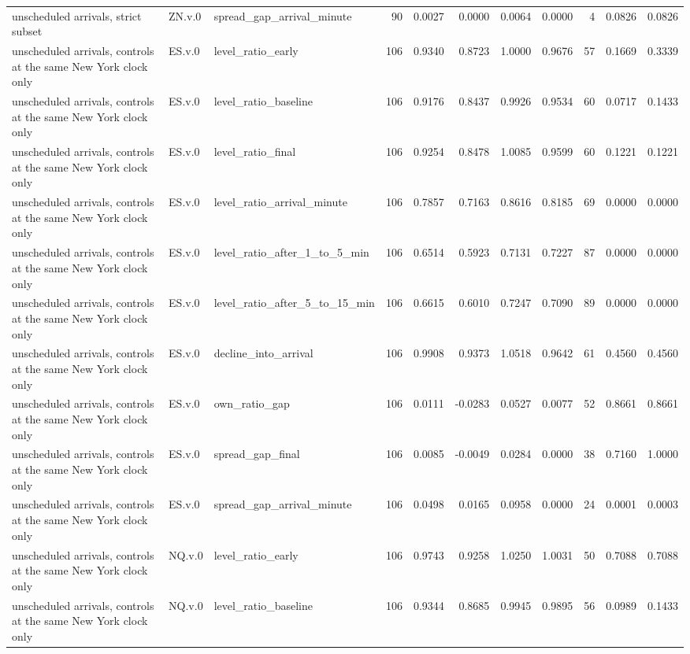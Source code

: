 \begin{tabular}{lllrrrrrrrr}
unscheduled arrivals, strict subset & ZN.v.0 & spread_gap_arrival_minute & 90 & 0.0027 & 0.0000 & 0.0064 & 0.0000 & 4 & 0.0826 & 0.0826 \\
unscheduled arrivals, controls at the same New York clock only & ES.v.0 & level_ratio_early & 106 & 0.9340 & 0.8723 & 1.0000 & 0.9676 & 57 & 0.1669 & 0.3339 \\
unscheduled arrivals, controls at the same New York clock only & ES.v.0 & level_ratio_baseline & 106 & 0.9176 & 0.8437 & 0.9926 & 0.9534 & 60 & 0.0717 & 0.1433 \\
unscheduled arrivals, controls at the same New York clock only & ES.v.0 & level_ratio_final & 106 & 0.9254 & 0.8478 & 1.0085 & 0.9599 & 60 & 0.1221 & 0.1221 \\
unscheduled arrivals, controls at the same New York clock only & ES.v.0 & level_ratio_arrival_minute & 106 & 0.7857 & 0.7163 & 0.8616 & 0.8185 & 69 & 0.0000 & 0.0000 \\
unscheduled arrivals, controls at the same New York clock only & ES.v.0 & level_ratio_after_1_to_5_min & 106 & 0.6514 & 0.5923 & 0.7131 & 0.7227 & 87 & 0.0000 & 0.0000 \\
unscheduled arrivals, controls at the same New York clock only & ES.v.0 & level_ratio_after_5_to_15_min & 106 & 0.6615 & 0.6010 & 0.7247 & 0.7090 & 89 & 0.0000 & 0.0000 \\
unscheduled arrivals, controls at the same New York clock only & ES.v.0 & decline_into_arrival & 106 & 0.9908 & 0.9373 & 1.0518 & 0.9642 & 61 & 0.4560 & 0.4560 \\
unscheduled arrivals, controls at the same New York clock only & ES.v.0 & own_ratio_gap & 106 & 0.0111 & -0.0283 & 0.0527 & 0.0077 & 52 & 0.8661 & 0.8661 \\
unscheduled arrivals, controls at the same New York clock only & ES.v.0 & spread_gap_final & 106 & 0.0085 & -0.0049 & 0.0284 & 0.0000 & 38 & 0.7160 & 1.0000 \\
unscheduled arrivals, controls at the same New York clock only & ES.v.0 & spread_gap_arrival_minute & 106 & 0.0498 & 0.0165 & 0.0958 & 0.0000 & 24 & 0.0001 & 0.0003 \\
unscheduled arrivals, controls at the same New York clock only & NQ.v.0 & level_ratio_early & 106 & 0.9743 & 0.9258 & 1.0250 & 1.0031 & 50 & 0.7088 & 0.7088 \\
unscheduled arrivals, controls at the same New York clock only & NQ.v.0 & level_ratio_baseline & 106 & 0.9344 & 0.8685 & 0.9945 & 0.9895 & 56 & 0.0989 & 0.1433 \\

\end{tabular}
